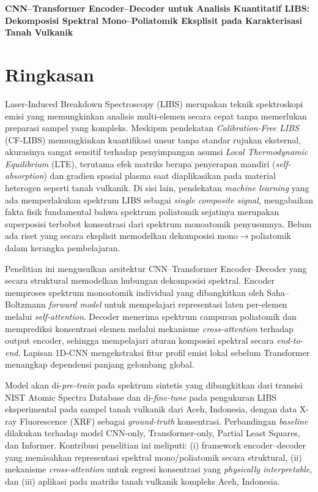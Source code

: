 \documentclass[12pt, a4paper]{article}
\begin{document}
\begin{center}
    \textbf{\Large CNN–Transformer Encoder–Decoder untuk Analisis Kuantitatif LIBS: Dekomposisi Spektral Mono–Poliatomik Eksplisit pada Karakterisasi Tanah Vulkanik}
\end{center}
\vspace{0.5cm}

\section*{Ringkasan}
Laser-Induced Breakdown Spectroscopy (LIBS) merupakan teknik spektroskopi emisi yang memungkinkan analisis multi-elemen secara cepat tanpa memerlukan preparasi sampel yang kompleks. Meskipun pendekatan \textit{Calibration-Free LIBS} (CF-LIBS) memungkinkan kuantifikasi unsur tanpa standar rujukan eksternal, akurasinya sangat sensitif terhadap penyimpangan asumsi \textit{Local Thermodynamic Equilibrium} (LTE), terutama efek matriks berupa penyerapan mandiri (\textit{self-absorption}) dan gradien spasial plasma saat diaplikasikan pada material heterogen seperti tanah vulkanik. Di sisi lain, pendekatan \textit{machine learning} yang ada memperlakukan spektrum LIBS sebagai \textit{single composite signal}, mengabaikan fakta fisik fundamental bahwa spektrum poliatomik sejatinya merupakan superposisi terbobot konsentrasi dari spektrum monoatomik penyusunnya. Belum ada riset yang secara eksplisit memodelkan dekomposisi mono$\rightarrow$poliatomik dalam kerangka pembelajaran.

Penelitian ini mengusulkan arsitektur CNN–Transformer Encoder–Decoder yang secara struktural memodelkan hubungan dekomposisi spektral. Encoder memproses spektrum monoatomik individual yang dibangkitkan oleh Saha–Boltzmann \textit{forward model} untuk mempelajari representasi laten per-elemen melalui \textit{self-attention}. Decoder menerima spektrum campuran poliatomik dan memprediksi konsentrasi elemen melalui mekanisme \textit{cross-attention} terhadap output encoder, sehingga mempelajari aturan komposisi spektral secara \textit{end-to-end}. Lapisan 1D-CNN mengekstraksi fitur profil emisi lokal sebelum Transformer menangkap dependensi panjang gelombang global.

Model akan di-\textit{pre-train} pada spektrum sintetis yang dibangkitkan dari transisi NIST Atomic Spectra Database dan di-\textit{fine-tune} pada pengukuran LIBS eksperimental pada sampel tanah vulkanik dari Aceh, Indonesia, dengan data X-ray Fluorescence (XRF) sebagai \textit{ground-truth} konsentrasi. Perbandingan \textit{baseline} dilakukan terhadap model CNN-only, Transformer-only, Partial Least Squares, dan Informer. Kontribusi penelitian ini meliputi: (i) framework encoder–decoder yang memisahkan representasi spektral mono/poliatomik secara struktural, (ii) mekanisme \textit{cross-attention} untuk regresi konsentrasi yang \textit{physically interpretable}, dan (iii) aplikasi pada matriks tanah vulkanik kompleks Aceh, Indonesia.
\end{document}
